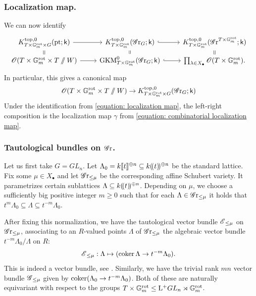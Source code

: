 \subsubsection{Localization map.}
We can now identify
\begin{equation}\label{equation: localization map}
   \begin{tikzcd}[row sep=5]
        K^{\top, 0}_{T \times \Gm^{\rot} \times G}(\pt; \k) \arrow[r] & K^{\top, 0}_{T \times \Gm^{\rot}}(\Gr_G; \k) \arrow[r, hookrightarrow] & K^{\top, 0}_{T \times \Gm^{\rot}}(\Gr^{T \times \Gm^{\rot}}; \k) \\
        \O(T \times \Gm^{\rot} \times T \sslash W) \arrow[r] \arrow[u, equal] & \GKM^{0}_{T \times \Gm^{\rot}}(\Gr_G; \k) \arrow[u, equal] \arrow[r, hookrightarrow] & \prod_{\lambda \in X_{\bullet}} \O(T \times \Gm^{\rot}) \arrow[u, equal].
    \end{tikzcd}
\end{equation} 
In particular, this gives a canonical map
\begin{equation}\label{equation: map from two copies of tori}
 \operatorname{\mathscr{O}}(T \times \mathbb{G}_m^{\mathrm{rot}} \times T \sslash W) \to K^{\mathrm{top}, 0}_{T \times \mathbb{G}_m^{\mathrm{rot}} \times G}(\operatorname{\mathscr{G}r}_G; \mathsf{k})
\end{equation}
Under the identification from \eqref{equation: localization map}, the left-right composition is the localization map $\gamma$ from \eqref{equation: combinatorial localization map}. 


\subsubsection{Tautological bundles on $\operatorname{\mathscr{G}r}$.}
Let us first take $G=GL_n$. Let $\Lambda_0 = k\llbracket t \rrbracket^{\oplus n} \subseteq k(\!( t )\!)^{\oplus n}$ be the standard lattice. Fix some $\mu \in X_{\bullet}$ and let $\operatorname{\mathscr{G}r}_{\leq \mu}$ be the corresponding affine Schubert variety. It parametrizes certain sublattices $\Lambda \subseteq k(\!( t )\!)^{\oplus n}$. Depending on $\mu$, we choose a sufficiently big positive integer $m \geq 0$ such that for each $\Lambda \in \operatorname{\mathscr{G}r}_{\leq \mu}$ it holds that $t^m \Lambda_0 \subseteq \Lambda \subseteq t^{-m} \Lambda_0$.

After fixing this normalization, we have the tautological vector bundle $\operatorname{\mathscr{E}}_{\leq \mu}$ on $\operatorname{\mathscr{G}r}_{\leq \mu}$, associating to an $R$-valued points $\Lambda$ of $\operatorname{\mathscr{G}r}_{\leq \mu}$ the algebraic vector bundle $t^{-m}\Lambda_0 / \Lambda$ on $R$:
\begin{equation*}
    \operatorname{\mathscr{E}}_{\leq \mu}: \Lambda \mapsto (\operatorname{coker} \Lambda \to t^{-m}\Lambda_0).
\end{equation*}
This is indeed a vector bundle, see \cite[proof of Theorem 1.1.3]{Zhu15}.
Similarly, we have the trivial rank $mn$ vector bundle $\operatorname{\mathscr{G}}_{\leq \mu}$ given by 
$\operatorname{coker} (\Lambda_0 \to t^{-m}\Lambda_0)$.
Both of these are naturally equivariant with respect to the groups $T \times \mathbb{G}_m^{\mathrm{rot}} \leq \mathrm{L^+} GL_n \rtimes \mathbb{G}_m^{\mathrm{rot}}$.


